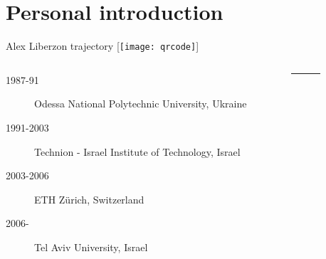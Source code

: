 \section{Personal introduction}


\begin{frame}[label=intro-1]{Alex Liberzon trajectory \hfill [\texttt{[image: qrcode]}]}

\begin{columns}
\begin{column}{.78\textwidth}
\begin{card}
\begin{description}
\item[1987-91] Odessa National Polytechnic University, Ukraine
\item[1991-2003] Technion - Israel Institute of Technology, Israel
\item[2003-2006] ETH Z\"{u}rich, Switzerland
\item[2006-] Tel Aviv University, Israel
\end{description}
\end{card}
\end{column}

    \begin{column}{.02\textwidth}
        \rule{.1mm}{0.7\textheight}
    \end{column}
    
\begin{column}{.2\textwidth}
\end{column}
\end{columns}
\end{frame}
%



